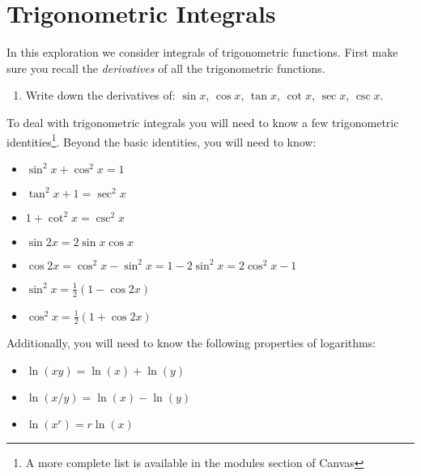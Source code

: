 \documentclass[12pt,letterpaper,fleqn]{article}
\theoremstyle{definition}
\begin{document}
\section*{Trigonometric Integrals}
In this exploration we consider integrals of trigonometric functions. First make sure you recall the \emph{derivatives} of all the trigonometric functions.
\begin{enumerate}
  \item Write down the derivatives of: $\sin x$, $\cos x$, $\tan x$, $\cot x$, $\sec x$, $\csc x$.
\end{enumerate}

To deal with trigonometric integrals you will need to know a few trigonometric identities\footnote{A more complete list is available in the modules section of Canvas}. Beyond the basic identities, you will need to know:
\begin{itemize}
  \item $\sin^2 x + \cos^2 x = 1$
  \item $\tan^2 x + 1 = \sec^2 x$
  \item $1 + \cot^2 x = \csc^2 x$
  \item $\sin 2x = 2\sin x\cos x$
  \item $\cos 2x = \cos^2 x - \sin^2 x = 1 - 2\sin^2 x = 2\cos^2 x - 1$
  \item $\sin^2 x = \frac{1}{2}(1 - \cos 2x)$
  \item $\cos^2 x = \frac{1}{2}(1 + \cos 2x)$
\end{itemize}
Additionally, you will need to know the following properties of logarithms:
\begin{itemize}
  \item $\ln(xy) = \ln(x) + \ln(y)$
  \item $\ln(x/y) = \ln(x) - \ln(y)$
  \item $\ln(x^r) = r\ln(x)$
\end{itemize}
\end{document}
